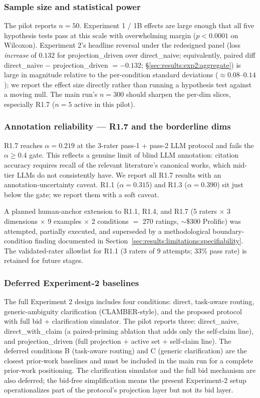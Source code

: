 \subsubsection{Sample size and statistical power}
The pilot reports $n = 50$. Experiment 1 / 1B effects are large enough that all five hypothesis tests pass at this scale with overwhelming margin ($p < 0.0001$ on Wilcoxon). Experiment 2's headline reversal under the redesigned panel (loss \emph{increase} of $0.132$ for projection\_driven over direct\_naive; equivalently, paired diff direct\_naive $-$ projection\_driven $= -0.132$; \S\ref{sec:results:exp2:aggregate}) is large in magnitude relative to the per-condition standard deviations ($\approx 0.08$--$0.14$); we report the effect size directly rather than running a hypothesis test against a moving null. The main run's $n = 300$ should sharpen the per-dim slices, especially R1.7 ($n = 5$ active in this pilot).

\subsubsection{Annotation reliability --- R1.7 and the borderline dims}
R1.7 reaches $\alpha = 0.219$ at the 3-rater pass-1 + pass-2 LLM protocol and fails the $\alpha \geq 0.4$ gate. This reflects a genuine limit of blind LLM annotation: citation accuracy requires recall of the relevant literature's canonical works, which mid-tier LLMs do not consistently have. We report all R1.7 results with an annotation-uncertainty caveat. R1.1 ($\alpha = 0.315$) and R1.3 ($\alpha = 0.390$) sit just below the gate; we report them with a soft caveat.

A planned human-anchor extension to R1.1, R1.4, and R1.7 (5 raters $\times$ 3 dimensions $\times$ 9 examples $\times$ 2 conditions $=$ 270 ratings, $\sim$\$300 Prolific) was attempted, partially executed, and superseded by a methodological boundary-condition finding documented in Section~\ref{sec:results:limitations:specifiability}. The validated-rater allowlist for R1.1 (3 raters of 9 attempts; 33\% pass rate) is retained for future stages.

\subsubsection{Deferred Experiment-2 baselines}
The full Experiment 2 design includes four conditions: direct, task-aware routing, generic-ambiguity clarification (CLAMBER-style), and the proposed protocol with full bid + clarification simulator. The pilot reports three: direct\_naive, direct\_with\_claim (a paired-priming ablation that adds only the self-claim line), and projection\_driven (full projection + active set + self-claim line). The deferred conditions B (task-aware routing) and C (generic clarification) are the closest prior-work baselines and must be included in the main run for a complete prior-work positioning. The clarification simulator and the full bid mechanism are also deferred; the bid-free simplification means the present Experiment-2 setup operationalizes part of the protocol's projection layer but not its bid layer.

